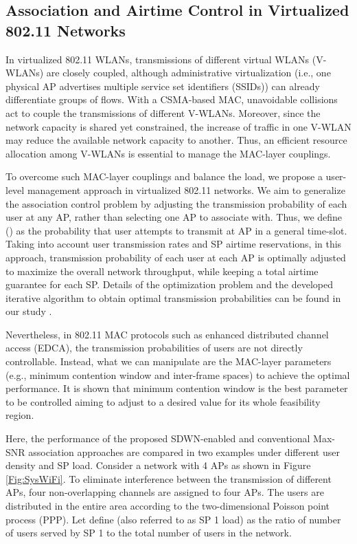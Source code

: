 \documentclass[conference]{IEEEtran}
\begin{document}
\subsection{Association and Airtime Control in Virtualized 802.11 Networks}
In virtualized 802.11 WLANs, transmissions of different virtual WLANs (V-WLANs) are closely coupled, although administrative virtualization (i.e., one physical AP advertises multiple service set identifiers (SSIDs)) can already differentiate groups of flows. With a CSMA-based MAC, unavoidable collisions act to couple the transmissions of different V-WLANs. Moreover, since the network capacity is shared yet constrained, the increase of traffic in one V-WLAN may reduce the available network capacity to another. Thus, an efficient resource allocation among V-WLANs is essential to manage the MAC-layer couplings.

To overcome such MAC-layer couplings and balance the load, we propose a user-level management approach in virtualized 802.11 networks. We aim to generalize the association control problem by adjusting the transmission probability of each user at any AP, rather than selecting one AP to associate with. Thus, we define  () as the probability that user  attempts to transmit at AP  in a general time-slot. Taking into account user transmission rates and SP airtime reservations, in this approach, transmission probability of each user at each AP is optimally adjusted to maximize the overall network throughput, while keeping a total airtime guarantee for each SP. Details of the optimization problem and the developed iterative algorithm to obtain optimal transmission probabilities can be found in our study \cite{Derakhshani2014}.

Nevertheless, in 802.11 MAC protocols such as enhanced distributed channel access (EDCA), the transmission probabilities of users are not directly controllable. Instead, what we can manipulate are the MAC-layer parameters (e.g., minimum contention window and inter-frame spaces) to achieve the optimal performance. It is shown that minimum contention window is the best parameter to be controlled aiming to adjust  to a desired value for its whole feasibility region.

Here, the performance of the proposed SDWN-enabled and conventional Max-SNR association approaches are compared in two examples under different user density and SP load. Consider a network with 4 APs as shown in Figure \ref{Fig:SysWiFi}. To eliminate interference between the transmission of different APs, four non-overlapping  channels are assigned to four APs. The users are distributed in the entire area according to the two-dimensional Poisson point process (PPP). Let define  (also referred to as SP 1 load) as the ratio of number of users served by SP 1 to the total number of users in the network.
\end{document}
